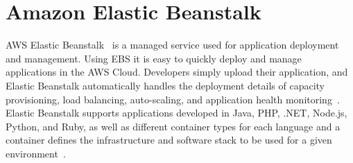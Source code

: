 \section{Amazon Elastic Beanstalk}

AWS Elastic Beanstalk~\cite{hid-sp18-420-amazon-elastic-beanstalk} is a managed
service used for application deployment and management. Using EBS it is easy to
quickly deploy and manage applications in the AWS Cloud. Developers simply
upload their application, and Elastic Beanstalk automatically handles the
deployment details of capacity provisioning, load balancing, auto-scaling, and
application health monitoring~\cite{hid-sp18-420-amazon-elastic-beanstalk_faq}.
Elastic Beanstalk supports applications developed in Java, PHP, .NET, Node.js,
Python, and Ruby, as well as different container types for each language and a
container defines the infrastructure and software stack to be used for a given
environment~\cite{hid-sp18-420-amazon-elastic-beanstalk_faq}.
